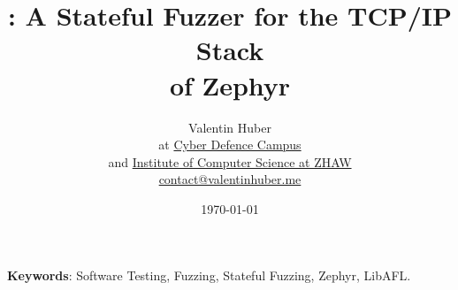 \documentclass{article}
\title{%
    \vspace{50px}%
    \Huge \proj : A Stateful Fuzzer for the TCP/IP Stack\\of Zephyr
    \vspace{250px}%
}
\author{%
    Valentin Huber\vspace{5px}\\%
    \small at \href{https://www.cydcampus.admin.ch/}{Cyber Defence Campus}\\%
    \small and \href{https://www.zhaw.ch/en/engineering/institutes-centres/init/}{Institute of Computer Science at ZHAW}\\%
    \small \href{mailto://contact@valentinhuber.me}{contact@valentinhuber.me}%
    \vspace{10px}
}
\date{\today}
\begin{document}
\maketitle

\clearpage\newpage
\begin{center}
  \begin{minipage}{0.8\textwidth}
    \vspace{70px}

    \begin{abstract}
      \lipsum[1]\lipsum[2]\lipsum[3]
    \end{abstract}
  \end{minipage}

  \vspace{70px}

  \begin{minipage}{0.7\textwidth}
    \textbf{Keywords}: Software Testing, Fuzzing, Stateful Fuzzing, Zephyr, LibAFL.
  \end{minipage}
\end{center}

\clearpage\newpage
\end{document}
